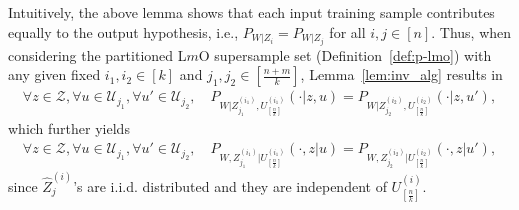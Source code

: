 \documentclass[onecolumn,romanappendices,10pt]{IEEEtran}
\newcommand{\Ucal}{{\mathcal U}}
\newcommand{\Zcal}{{\mathcal Z}}
\begin{document}
	Intuitively, the above lemma shows that each input training sample contributes equally to the output hypothesis, i.e., $P_{W|Z_i} = P_{W|Z_j}$ for all $i,j \in [n]$. Thus, when considering the partitioned L$m$O supersample set (Definition~\ref{def:p-lmo}) with any given fixed $i_1,i_2 \in [k]$ and $j_1,j_2 \in [\frac{n+m}{k}]$, Lemma~\ref{lem:inv_alg} results in
	\begin{align}
		\forall z \in \Zcal, \forall u \in \Ucal_{j_1}, \forall u' \in \Ucal_{j_2}, \quad P_{W | Z^{(i_1)}_{j_1}, U^{(i_1)}_{[\frac{n}{k}]}}(\cdot | z, u) = P_{W | Z^{(i_2)}_{j_2}, U^{(i_2)}_{[\frac{n}{k}]}}(\cdot | z, u'), \label{eq:invariant_u_1}
	\end{align}
	which further yields 
	\begin{align}
		\forall z \in \Zcal, \forall u \in \Ucal_{j_1}, \forall u' \in \Ucal_{j_2}, \quad P_{W, Z^{(i_1)}_{j_1} | U^{(i_1)}_{[\frac{n}{k}]}}(\cdot, z | u) = P_{W, Z^{(i_2)}_{j_2} | U^{(i_2)}_{[\frac{n}{k}]}}(\cdot, z | u'), \label{eq:invariant_u_2}
	\end{align}
	since $\hat{Z}^{(i)}_j$'s are i.i.d. distributed and they are independent of $U^{(i)}_{[\frac{n}{k}]}$.
	
\end{document}
